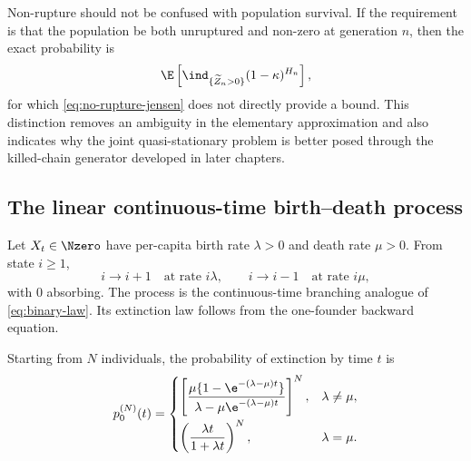 Non-rupture should not be confused with population survival.  If the requirement is
that the population be both unruptured and non-zero at generation \(n\), then the
exact probability is
\begin{equation}
  \E\left[\ind_{\{\widetilde Z_n>0\}}(1-\kappa)^{H_n}\right],
  \label{eq:joint-survival-no-rupture}
\end{equation}
for which \cref{eq:no-rupture-jensen} does not directly provide a bound.  This
distinction removes an ambiguity in the elementary approximation and also indicates
why the joint quasi-stationary problem is better posed through the killed-chain
generator developed in later chapters.

\subsection{The linear continuous-time birth--death process}
\label{sec:continuous-bd}

Let \(X_t\in\Nzero\) have per-capita birth rate \(\lambda>0\) and death rate
\(\mu>0\).  From state \(i\geq1\),
\begin{equation}
  i\longrightarrow i+1\quad\text{at rate }i\lambda,
  \qquad
  i\longrightarrow i-1\quad\text{at rate }i\mu,
  \label{eq:linear-bd-rates}
\end{equation}
with \(0\) absorbing.  The process is the continuous-time branching analogue of
\cref{eq:binary-law}.  Its extinction law follows from the one-founder backward
equation.

\begin{proposition}
\label{prop:continuous-bd-extinction}
Starting from \(N\) individuals, the probability of extinction by time \(t\) is
\cite{Allen2010}
\begin{equation}
  p_0^{(N)}(t)=
  \begin{cases}
    \displaystyle
    \left[
      \frac{\mu\{1-\e^{-(\lambda-\mu)t}\}}
           {\lambda-\mu\e^{-(\lambda-\mu)t}}
    \right]^N,
      &\lambda\neq\mu,\\[4mm]
    \displaystyle
    \left(\frac{\lambda t}{1+\lambda t}\right)^N,
      &\lambda=\mu.
  \end{cases}
  \label{eq:continuous-bd-extinction}
\end{equation}
\end{proposition}

